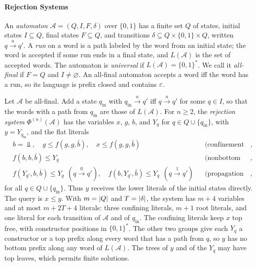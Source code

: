 \paragraph{Rejection Systems}
An \emph{automaton} $\mathcal A=(Q,I,F,\delta)$ over $\{0,1\}$ has a finite
set $Q$ of states, initial states $I\subseteq Q$, final states $F\subseteq Q$,
and transitions $\delta\subseteq Q\times\{0,1\}\times Q$, written
$q\xrightarrow{a}q'$. A \emph{run} on a word is a path labeled by the word
from an initial state; the word is accepted if some run ends in a final
state, and $L(\mathcal A)$ is the set of accepted words. The automaton is
\emph{universal} if $L(\mathcal A)=\{0,1\}^*$. We call it \emph{all-final} if
$F=Q$ and $I\ne\varnothing$. An all-final automaton accepts a word iff the
word has a run, so its language is prefix closed and contains $\varepsilon$.

Let $\mathcal A$ be all-final. Add a state $q_{\mathrm{in}}$ with
$q_{\mathrm{in}}\xrightarrow{a}q'$ iff $q\xrightarrow{a}q'$ for some $q\in I$,
so that the words with a path from $q_{\mathrm{in}}$ are those of
$L(\mathcal A)$. For $n\ge2$, the \emph{rejection system}
$\Phi^{(n)}(\mathcal A)$ has the variables $x$, $g$, $b$, and $Y_q$ for
$q\in Q\cup\{q_{\mathrm{in}}\}$, with $y=Y_{q_{\mathrm{in}}}$, and the flat
literals
\[
\begin{aligned}
 &b=\Bot,\quad g\le f(g,g,\bar b),\quad x\le f(g,g,\bar b)
   &&\text{(confinement to binary paths)},\\
 &f(b,b,\bar b)\le Y_q &&\text{(nonbottom roots)},\\
 &f(Y_{q'},b,\bar b)\le Y_q\ \ (q\xrightarrow0q'),\quad
  f(b,Y_{q'},\bar b)\le Y_q\ \ (q\xrightarrow1q')
   &&\text{(propagation along transitions)},
\end{aligned}
\]
for all $q\in Q\cup\{q_{\mathrm{in}}\}$. Thus $y$ receives the lower literals
of the initial states directly. The query is $x\le y$. With $m=\lvert Q\rvert$ and
$T=\lvert \delta\rvert$, the system has $m+4$ variables and at most $m+2T+4$ literals:
three confining literals, $m+1$ root literals, and one literal for each
transition of $\mathcal A$ and of $q_{\mathrm{in}}$. The confining literals
keep $x$ top free, with constructor positions in $\{0,1\}^*$. The other two
groups give each $Y_q$ a constructor or a top prefix along every word that
has a path from $q$, so $y$ has no bottom prefix along any word of
$L(\mathcal A)$. The trees of $y$ and of the $Y_q$ may have top leaves, which
permits finite solutions.

